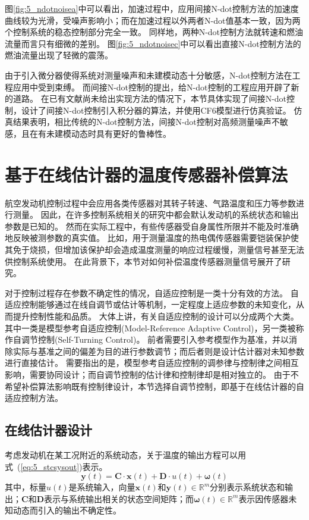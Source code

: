 \documentclass{article}
\begin{document}
图\ref{fig:5_ndotnoisea}中可以看出，加速过程中，应用间接N-dot控制方法的加速度曲线较为光滑，受噪声影响小；而在加速过程以外两者N-dot值基本一致，因为两个控制系统的稳态控制部分完全一致。
同样地，两种N-dot控制方法就转速和燃油流量而言只有细微的差别。
图\ref{fig:5_ndotnoisec}中可以看出直接N-dot控制方法的燃油流量出现了轻微的震荡。

由于引入微分器使得系统对测量噪声和未建模动态十分敏感，N-dot控制方法在工程应用中受到束缚。
而间接N-dot控制的提出，给N-dot控制的工程应用开辟了新的道路。
在已有文献尚未给出实现方法的情况下，本节具体实现了间接N-dot控制，设计了间接N-dot控制引入积分器的算法，并使用CF6模型进行仿真验证。
仿真结果表明，相比传统的N-dot控制方法，间接N-dot控制对高频测量噪声不敏感，且在有未建模动态时具有更好的鲁棒性。

\section{基于在线估计器的温度传感器补偿算法}
\label{sec:5_stestimator}

航空发动机控制过程中会应用各类传感器对其转子转速、气路温度和压力等参数进行测量。
因此，在许多控制系统相关的研究中都会默认发动机的系统状态和输出参数是已知的。
然而在实际工程中，有些传感器受自身属性所限并不能及时准确地反映被测参数的真实值。
比如，用于测量温度的热电偶传感器需要铠装保护使其免于烧损，但增加该保护却会造成温度测量的响应过程缓慢，测量信号甚至无法供控制系统使用\cite{H.AustinSpang1999Control}。
在此背景下，本节对如何补偿温度传感器测量信号展开了研究。

对于控制过程存在参数不确定性的情况，自适应控制是一类十分有效的方法。
自适应控制能够通过在线自调节或估计等机制，一定程度上适应参数的未知变化，从而提升控制性能和品质。
大体上讲，有关自适应控制的设计可以分成两个大类。
其中一类是模型参考自适应控制(Model-Reference Adaptive Control)，另一类被称作自调节控制(Self-Turning Control)。
前者需要引入参考模型作为基准，并以消除实际与基准之间的偏差为目的进行参数调节\cite{Astroem2013Adaptive,Goodwin2014Adaptive}；而后者则是设计估计器对未知参数进行直接估计。
需要指出的是，模型参考自适应控制的调参律与控制律之间相互影响，需要协同设计；而自调节控制的估计律和控制律却是相对独立的\cite{Slotine2005Applied}。
由于不希望补偿算法影响既有控制律设计，本节选择自调节控制，即基于在线估计器的自适应控制方法。

\subsection{在线估计器设计}

考虑发动机在某工况附近的系统动态，关于温度的输出方程可以用式~(\ref{eq:5_stcsysout})表示。
\begin{equation}
\bm{y}(t) = \mathbf{C}\cdot \bm{x}(t)+ \mathbf{D} \cdot u(t) + \bm{\omega}(t)
\label{eq:5_stcsysout}
\end{equation}
其中，标量$u(t)$是系统输入，向量$\bm{x}(t)$和$\bm{y}(t)\in\mathbb{R}^{m}$分别表示系统状态和输出；$\mathbf{C}$和$\mathbf{D}$表示与系统输出相关的状态空间矩阵；而$\bm{\omega}(t)\in\mathbb{R}^{m}$表示因传感器未知动态而引入的输出不确定性。
\end{document}
